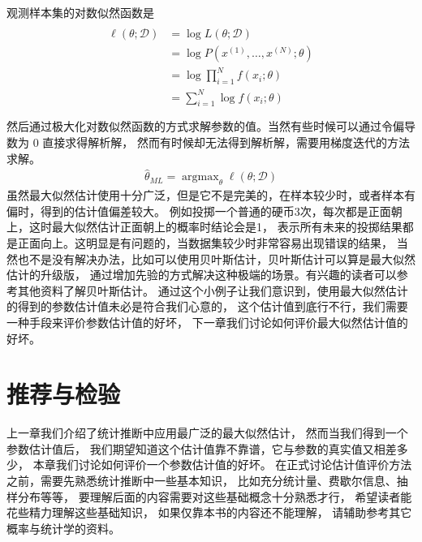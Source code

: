 \documentclass[letterpaper,10pt,english]{sphinxmanual}
\begin{document}
观测样本集的对数似然函数是
\begin{align}\label{equation:最大似然估计/content:最大似然估计/content:24}\!\begin{aligned}
\begin{aligned} \ell (\theta;\mathcal{D}) &= \log L(\theta;\mathcal{D})\\
&= \log  P(x^{(1)}, \ldots, x^{(N)} ;\theta )\\
&= \log  \prod_{i=1}^{N} f(x_i ; \theta)\\
&= \sum_{i=1}^{N} \log f(x_i ; \theta)  \end{aligned}\\
\end{aligned}\end{align}
然后通过极大化对数似然函数的方式求解参数的值。当然有些时候可以通过令偏导数为 \(0\) 直接求得解析解，
然而有时候却无法得到解析解，需要用梯度迭代的方法求解。
\begin{equation}\label{equation:最大似然估计/content:最大似然估计/content:25}
\begin{split}\hat{\theta}_{ML} = \mathop{\arg \max}_{\theta} \ell (\theta;\mathcal{D})\end{split}
\end{equation}
虽然最大似然估计使用十分广泛，但是它不是完美的，在样本较少时，或者样本有偏时，得到的估计值偏差较大。
例如投掷一个普通的硬币3次，每次都是正面朝上，这时最大似然估计正面朝上的概率时结论会是1，
表示所有未来的投掷结果都是正面向上。这明显是有问题的，当数据集较少时非常容易出现错误的结果，
当然也不是没有解决办法，比如可以使用贝叶斯估计，贝叶斯估计可以算是最大似然估计的升级版，
通过增加先验的方式解决这种极端的场景。有兴趣的读者可以参考其他资料了解贝叶斯估计。
通过这个小例子让我们意识到，使用最大似然估计的得到的参数估计值未必是符合我们心意的，
这个估计值到底行不行，我们需要一种手段来评价参数估计值的好坏，
下一章我们讨论如何评价最大似然估计值的好坏。


\chapter{推荐与检验}
\label{\detokenize{_u63a8_u65ad_u4e0e_u68c0_u9a8c/content:ch-influence-and-test}}\label{\detokenize{_u63a8_u65ad_u4e0e_u68c0_u9a8c/content:id1}}\label{\detokenize{_u63a8_u65ad_u4e0e_u68c0_u9a8c/content::doc}}
上一章我们介绍了统计推断中应用最广泛的最大似然估计，
然而当我们得到一个参数估计值后，
我们期望知道这个估计值靠不靠谱，它与参数的真实值又相差多少，
本章我们讨论如何评价一个参数估计值的好坏。
在正式讨论估计值评价方法之前，需要先熟悉统计推断中一些基本知识，
比如充分统计量、费歇尔信息、抽样分布等等，
要理解后面的内容需要对这些基础概念十分熟悉才行，
希望读者能花些精力理解这些基础知识，
如果仅靠本书的内容还不能理解，
请辅助参考其它概率与统计学的资料。
\end{document}
